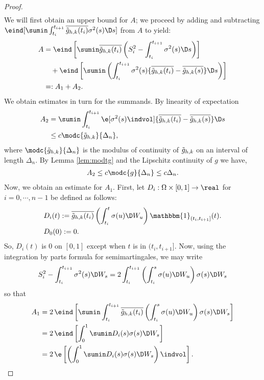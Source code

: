 \begin{appendices}
\begin{proof}
\begin{align}
\end{align}
We will first obtain an upper bound for $A$; we proceed by adding and subtracting $\eind [\sumin\int_{t_i}^{t_{i+1}}\btghki \sigma^2(s)  \D s]$  from  $A$ to yield: 
\begin{align}
  A & = \eind\left[\sumin\btghki \left(S_i^2 -\int_{t_i}^{t_{i+1}} \sigma^2(s) \D s\right)\right ]\notag \\
  &\quad +  \eind\left[\sumin\left(\int_{t_i}^{t_{i+1}} \sigma^2(s) \{\btghki - \btghks\} \D s\right) \right]\notag\\
  &=:A_{1} + A_{2} \notag.
  \label{}
\end{align}
We obtain estimates in turn for the summands. By linearity of expectation 
\begin{align}
  A_{2} &= \sumin \int_{t_i}^{t_{i+1}} \e[\sigma^2(s) \indvol] \{\btghki - \btghks\} \D s\notag\\
  &\le c\modc{\tghk}{\Delta_n},\notag
  \label{}
\end{align}
where $\modc{\tghk}{\Delta_n}$ is the modulus of continuity of $\tilde{g}_{h,k}$ on an interval of length $\Delta_n$. By  Lemma \eqref{lem:modtg} and the Lipschitz continuity of $g$ we have, 
\begin{align}
  A_{2} \le c\modc{g}{\Delta_n} \le c \Delta_n.\notag \\
  \label{}
\end{align}
Now, we obtain an estimate for $A_{1}$. First, let $D_i: \Omega\times[0,1] \to \real$ for $i = 0, \cdots, n-1$ be defined as follows:  
\begin{align}
&D_{i}(t) := \btghki\left(\int_{t_i}^{t} \sigma(u)\D W_u\right)\mathbbm{1}_{(t_i, t_{i+1}]}(t).
  \label{eq:Di}\\
&D_0(0) := 0.
\end{align}
So, $D_i(t)$ is 0 on $[0,1]$ except when $t$ is in $(t_i, t_{i+1}]$. Now, using the integration by parts formula for semimartingales, we may write
\begin{align}
  S^2_i - \int^{t_{i+ 1}}_{t_i} \sigma^2(s) \D W_s = 2\int_{t_i}^{t_{i+1}}\left(\int_{t_i}^{s} \sigma(u)\D W_u\right)\sigma(s) \D W_s\notag
  \label{}
\end{align}
so that 
\begin{align}
  A_1 &= 2\,\eind\left[\sumin\int_{t_i}^{t_{i+1}}\btghki\left(\int_{t_i}^{s} \sigma(u)\D W_u\right)\sigma(s) \D W_s\right ]\notag \\
  &=2\,\eind\left[\int_0^1\sumin D_i(s) \sigma(s) \D W_s \right]\notag\\
  &=2\,\e\left[\left(\int_0^1\sumin D_i(s) \sigma(s) \D W_s\right)\indvol \right]\notag.

\end{align}
\end{proof}
\end{appendices}
